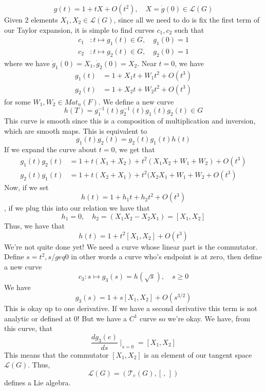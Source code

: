 \[	 g( t)  = 1 + tX + O ( t^2 ), \quad X = \dot{ g} ( 0 ) \in \mathcal{ L }( G )  
\] Given 2 elements $ X_1, X_2 \in \mathcal{ L } ( G ) $, since all 
we need to do is fix the first term of our Taylor expansion, 
it is simple to find curves $ c_1, c_2 $ such that 
\begin{align*}
c_1 &: t \mapsto g_1 ( t) \in G, \quad g_1 ( 0 )  = 1 \\
c_2 &: t \mapsto g_2( t) \in G, \quad g_2 ( 0 )  = 1
\end{align*} where we have $ \dot{ g}_1( 0 )  = X_1, \dot{ g}_2 ( 0 )  = X_2$. 
Near  $ t = 0 $, we have 
\begin{align*}
g_1 ( t ) & = 1 + X_1 t + W_1 t^2 + O ( t^3 ) \\
g_2 ( t) &= 1 + X_2 t + W_2 t^2 + O ( t^ 3 ) 
\end{align*}for some $ W_1, W_2 \in Mat_n ( F) $. 
We define a new curve 
\[
h ( T)  = g^{ - 1}_1( t)  g^{ -1 }_2 ( t ) g_1 ( t) g_2( t) \in G 
\] This curve is smooth since this is a composition of multiplication 
and inversion, which are smooth maps. This is equivalent to 
\[
g_1( t) g_2( t) = g_2 ( t ) g_1 ( t) h ( t) 
\] If we expand the curve about $ t = 0 $, we get 
that 
\begin{align*}
g_1( t)g_2 ( t) &=  1 + t ( X_1 + X_2 ) +t^2 ( X_1 X_2 + W_1 + W_2 ) + O ( t^3)  \\
g_2( t) g_1( t) &=  1 + t ( X_2 + X_1 ) + t^2 ( X_2 X_1 + W_1 + W_2 + O ( t^3 ) 
\end{align*}
Now, if we set 
\[
h ( t) = 1 + h_1 t + h_2 t^2 + O ( t^3 ) 
\], if we plug this into our relation we have that 
\[
h_1 = 0, \quad h_2  = ( X_1 X_2 - X_2 X_1 ) =  [ X_1 , X_2 ] 
\] Thus, we have that 
\[
h ( t)  = 1 + t^2 [ X_1 , X_2 ] + O ( t^3) 
\] We're not quite done yet! We need a curve whose 
linear part is the commutator. Define $ s = t^2 , s /geq 0 $ 
in other words a curve who's endpoint is at zero, then 
define a new curve 
\[
c_3 : s \mapsto g_3 ( s)  = h ( \sqrt{ s } ), \quad s \ge  0 
\] We have 
\[
g_3 (s)  = 1 + s [ X_1, X_2 ] + O ( s^{ 3 /2 } ) 
\] This is okay up to one derivative. If we have a second derivative
this term is not analytic or defined at 0! But we have a $ C^1 $ curve so we're 
okay. We have, from this curve, that 
\[
\frac{ d g_3 ( e) }{ ds } \mid_{ s  = 0}  = [ X_1 , X_2 ] 
\] This means that the commutator $ [ X_1 , X_2 ] $ is an element of our 
tangent space $ \mathcal{ L } ( G ) $. Thus, 
\[
\mathcal{ L } ( G ) = ( \mathcal{ T }_ e ( G ) , [ \, , \, ] ) 
\] defines a Lie algebra. 

\pagebreak
